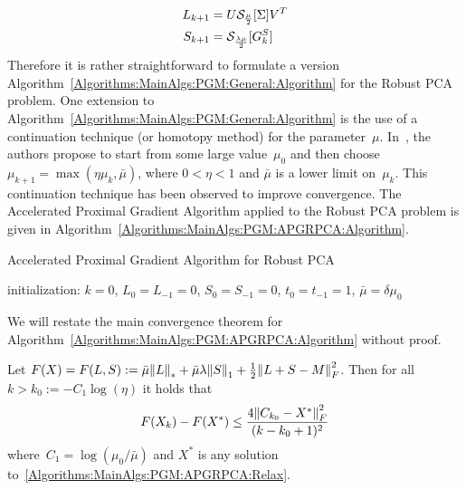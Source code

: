\documentclass{../../common/projectreport}
\begin{document}
\begin{align}
L_{k+1} &= U {\mathcal{S}}_\frac{\mu}{2}[\Sigma] V^T \label{Algorithms:MainAlgs:PGM:APGRPCA:LIterate} \\
S_{k+1} &= {\mathcal{S}}_\frac{\lambda\mu}{2}[G_k^S] \label{Algorithms:MainAlgs:PGM:APGRPCA:SIterate}
\end{align}
Therefore it is rather straightforward to formulate a version Algorithm~\ref{Algorithms:MainAlgs:PGM:General:Algorithm} for the Robust PCA problem. One extension to Algorithm~\ref{Algorithms:MainAlgs:PGM:General:Algorithm} is the use of a continuation technique (or homotopy method) for the parameter~$\mu$. In~\cite{Lin:2009kx}, the authors propose to start from some large value~$\mu_0$ and then choose~$\mu_{k+1} = \max(\eta \mu_k,\bar{\mu})$, where $0<\eta<1$ and $\bar{\mu}$ is a lower limit on~$\mu_k$. This continuation technique has been observed to improve convergence. The Accelerated Proximal Gradient Algorithm applied to the Robust PCA problem is given in Algorithm~\ref{Algorithms:MainAlgs:PGM:APGRPCA:Algorithm}.
%
\begin{algorithm}
\caption{Accelerated Proximal Gradient Algorithm for Robust PCA}
initialization: $k=0$, $L_0=L_{-1}=0$, $S_0=S_{-1}= 0$, $t_0=t_{-1} = 1$, $\bar{\mu} = \delta \mu_0$\;
\label{Algorithms:MainAlgs:PGM:APGRPCA:Algorithm}
\end{algorithm}

We will restate the main convergence theorem for Algorithm~\ref{Algorithms:MainAlgs:PGM:APGRPCA:Algorithm} without proof. 

\begin{theorem}
Let $F(X) = F(L,S) := \bar{\mu} {\left\|L\right\|}_{*}^{} + \bar{\mu} \lambda {\left\|S\right\|}_{1}^{} + \frac{1}{2} {\left\|L+S-M\right\|}_{F}^{2}$. Then for all $k>k_0 := -C_1\log(\eta)$ it holds that
\begin{align*}
F(X_k) - F(X^*) \leq \frac{4{\left\|C_{k_0}-X^*\right\|}_{F}^{2}}{(k-k_0+1)^2}
\end{align*}
where~$C_1 = \log(\mu_0/\bar{\mu})$ and $X^*$ is any solution to~\eqref{Algorithms:MainAlgs:PGM:APGRPCA:Relax}.
\end{theorem}
\end{document}

